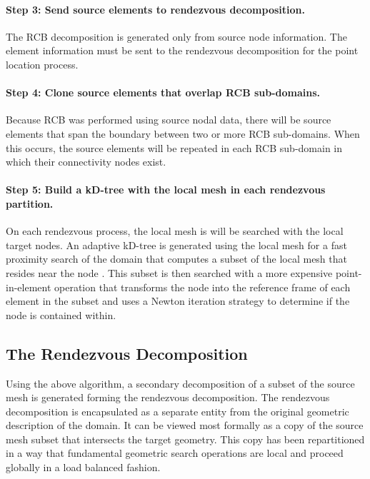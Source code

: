 \documentclass[letterpaper,12pt]{article}
\begin{document}
\paragraph{Step 3: Send source elements to rendezvous decomposition.}
The RCB decomposition is generated only from source node
information. The element information must be sent to the rendezvous
decomposition for the point location process. 

\paragraph{Step 4: Clone source elements that overlap RCB
  sub-domains.}  Because RCB was performed using source nodal data,
there will be source elements that span the boundary between two or
more RCB sub-domains. When this occurs, the source elements will be
repeated in each RCB sub-domain in which their connectivity nodes
exist. 

\paragraph{Step 5: Build a kD-tree with the local mesh in each rendezvous
  partition.}  On each rendezvous process, the local mesh is will be
searched with the local target nodes. An adaptive kD-tree is generated
using the local mesh for a fast proximity search of the domain that
computes a subset of the local mesh that resides near the node
\cite{Bentley_1975}. This subset is then searched with a more
expensive point-in-element operation that transforms the node into the
reference frame of each element in the subset and uses a Newton
iteration strategy to determine if the node is contained within.

\subsection{The Rendezvous Decomposition}\label{subsec:rendezvous_decomp}
Using the above algorithm, a secondary decomposition of a subset of
the source mesh is generated forming the rendezvous decomposition. The
rendezvous decomposition is encapsulated as a separate entity from the
original geometric description of the domain. It can be viewed most
formally as a copy of the source mesh subset that intersects the
target geometry. This copy has been repartitioned in a way that
fundamental geometric search operations are local and proceed globally
in a load balanced fashion.
\end{document}
